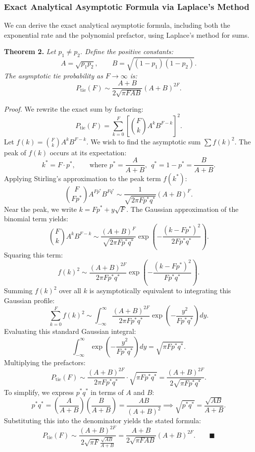 \documentclass[
  letterpaper,
  DIV=11,
  numbers=noendperiod]{scrartcl}
\begin{document}
\subsubsection{Exact Analytical Asymptotic Formula via Laplace's
Method}\label{exact-analytical-asymptotic-formula-via-laplaces-method}

We can derive the exact analytical asymptotic formula, including both
the exponential rate and the polynomial prefactor, using Laplace's
method for sums.

\textbf{Theorem 2.} \emph{Let \(p_1 \neq p_2\). Define the positive
constants:} \[
A = \sqrt{p_1 p_2}, \qquad B = \sqrt{(1-p_1)(1-p_2)}.
\] \emph{The asymptotic tie probability as \(F \to \infty\) is:} \[
P_{\text{tie}}(F) \sim \frac{A+B}{2\sqrt{\pi F AB}} (A+B)^{2F}.
\]

\emph{Proof.} We rewrite the exact sum by factoring: \[
P_{\text{tie}}(F) = \sum_{k=0}^{F} \left[ \binom{F}{k} A^k B^{F-k} \right]^2.
\] Let \(f(k) = \binom{F}{k} A^k B^{F-k}\). We wish to find the
asymptotic sum \(\sum f(k)^2\). The peak of \(f(k)\) occurs at its
expectation: \[
k^* = F \cdot p^*, \qquad \text{where } p^* = \frac{A}{A+B}, \ \ q^* = 1 - p^* = \frac{B}{A+B}.
\] Applying Stirling's approximation to the peak term \(f(k^*)\): \[
\binom{F}{F p^*} A^{F p^*} B^{F q^*} \sim \frac{1}{\sqrt{2\pi F p^* q^*}} (A+B)^F.
\] Near the peak, we write \(k = F p^* + y \sqrt{F}\). The Gaussian
approximation of the binomial term yields: \[
\binom{F}{k} A^k B^{F-k} \sim \frac{(A+B)^F}{\sqrt{2\pi F p^* q^*}} \exp\left( -\frac{(k - F p^*)^2}{2 F p^* q^*} \right).
\] Squaring this term: \[
f(k)^2 \sim \frac{(A+B)^{2F}}{2\pi F p^* q^*} \exp\left( -\frac{(k - F p^*)^2}{F p^* q^*} \right).
\] Summing \(f(k)^2\) over all \(k\) is asymptotically equivalent to
integrating this Gaussian profile: \[
\sum_{k=0}^{F} f(k)^2 \sim \int_{-\infty}^{\infty} \frac{(A+B)^{2F}}{2\pi F p^* q^*} \exp\left( -\frac{y^2}{F p^* q^*} \right) dy.
\] Evaluating this standard Gaussian integral: \[
\int_{-\infty}^{\infty} \exp\left( -\frac{y^2}{F p^* q^*} \right) dy = \sqrt{\pi F p^* q^*}.
\] Multiplying the prefactors: \[
P_{\text{tie}}(F) \sim \frac{(A+B)^{2F}}{2\pi F p^* q^*} \cdot \sqrt{\pi F p^* q^*} = \frac{(A+B)^{2F}}{2\sqrt{\pi F p^* q^*}}.
\] To simplify, we express \(p^* q^*\) in terms of \(A\) and \(B\): \[
p^* q^* = \left( \frac{A}{A+B} \right) \left( \frac{B}{A+B} \right) = \frac{AB}{(A+B)^2} \implies \sqrt{p^* q^*} = \frac{\sqrt{AB}}{A+B}.
\] Substituting this into the denominator yields the stated formula: \[
P_{\text{tie}}(F) \sim \frac{(A+B)^{2F}}{2\sqrt{\pi F} \frac{\sqrt{AB}}{A+B}} = \frac{A+B}{2\sqrt{\pi F AB}} (A+B)^{2F}. \qquad \blacksquare
\]
\end{document}
